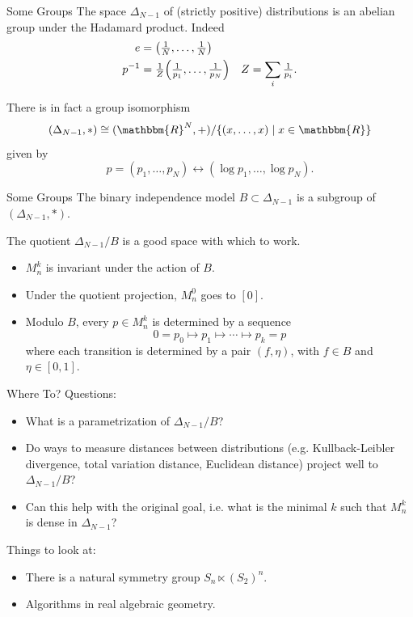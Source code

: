 \documentclass[mathserif,xcolor=dvipsnames]{beamer}
\renewcommand*{\R}{\mathbbm{R}}
\begin{document}
\begin{frame}{Some Groups}
    The space $\Delta_{N-1}$ of (strictly positive) distributions is an abelian
    group under the Hadamard product.  Indeed
    \begin{align*}
        e &= \pdil*{ \tfrac 1 N, \ldots, \tfrac 1 N }\\
        \inv p &= \tfrac 1 Z \pdil*{ \tfrac{1}{p_1}, \ldots, \tfrac{1}{p_N} }
        & Z = \sum_i \tfrac{1}{p_i}.
    \end{align*}

    \linespace
    There is in fact a group isomorphism
    \[
        (\Delta_{N-1}, *) \cong (\R^N, +) / \{(x, \ldots, x) \mid x \in \R\}
    \]
    given by
    \[
        p = (p_1, \ldots, p_N) \longleftrightarrow (\log p_1, \ldots, \log p_N).
    \]
\end{frame}

\begin{frame}{Some Groups}
    The binary independence model $B \subset \Delta_{N-1}$ is a subgroup of
    $(\Delta_{N-1}, *)$.

    \linespace
    The quotient $\Delta_{N-1} / B$ is a good space with which to work.
    \begin{itemize}
        \item $M_n^k$ is invariant under the action of $B$.
        \item Under the quotient projection, $M_n^0$ goes to $[0]$.
        \item Modulo $B$, every $p \in M_n^k$ is determined by a sequence
        \[
            0 = p_0 \mapsto p_1 \mapsto \cdots \mapsto p_k = p
        \]
        where each transition is determined by a pair $(f, \eta)$, with $f \in
        B$ and $\eta \in [0,1]$.
    \end{itemize}
\end{frame}

\begin{frame}{Where To?}
    Questions:
    \begin{itemize}
        \item What is a parametrization of $\Delta_{N-1} / B$?
        \item Do ways to measure distances between distributions (e.g.
        Kullback-Leibler divergence, total variation distance, Euclidean
        distance) project well to $\Delta_{N-1} / B$?
        \item Can this help with the original goal, i.e. what is the minimal $k$
        such that $M_n^k$ is dense in $\Delta_{N-1}$?
    \end{itemize}

    Things to look at:
    \begin{itemize}
        \item There is a natural symmetry group $S_n \ltimes (S_2)^n$.
        \item Algorithms in real algebraic geometry.
    \end{itemize}
\end{frame}
\end{document}
